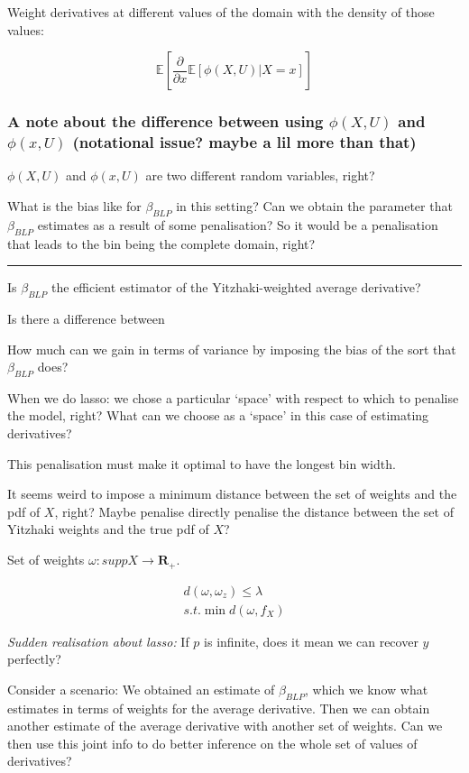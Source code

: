 \documentclass[a4paper,12pt,twoside]{article}
\begin{document}
Weight derivatives at different values of the domain with the density of those values:

\begin{equation}
	\mathbb{E} \left[ \frac{\partial}{\partial x} \mathbb{E} \left[ \phi(X, U) | X = x \right] \right]
\end{equation}

\subsubsection*{A note about the difference between using $\phi(X, U)$ and $\phi(x, U)$ (notational issue? maybe a lil more than that)}

$\phi(X, U)$ and $\phi(x, U)$ are two different random variables, right?


What is the bias like for $\beta_{BLP}$ in this setting?
Can we obtain the parameter that $\beta_{BLP}$ estimates as a result of some penalisation? So it would be a penalisation that leads to the bin being the complete domain, right?

\noindent\rule{\textwidth}{0.5pt}


Is $\beta_{BLP}$ the efficient estimator of the Yitzhaki-weighted average derivative?

Is there a difference between 

How much can we gain in terms of variance by imposing the bias of the sort that $\beta_{BLP}$ does?

When we do lasso: we chose a particular `space' with respect to which to penalise the model, right? What can we choose as a `space' in this case of estimating derivatives?

This penalisation must make it optimal to have the longest bin width.

It seems weird to impose a minimum distance between the set of weights and the pdf of $X$, right? Maybe penalise directly penalise the distance between the set of Yitzhaki weights and the true pdf of $X$?

Set of weights $\omega: supp X \rightarrow \mathbf{R}_+$.

\begin{align}
	d(\omega, \omega_z) \leq \lambda \\
	s.t. \min d(\omega, f_X)
\end{align}

\textit{Sudden realisation about lasso:} If $p$ is infinite, does it mean we can recover $y$ perfectly?


Consider a scenario: We obtained an estimate of $\beta_{BLP}$, which we know what estimates in terms of weights for the average derivative. Then we can obtain another estimate of the average derivative with another set of weights. Can we then use this joint info to do better inference on the whole set of values of derivatives?
\end{document}

